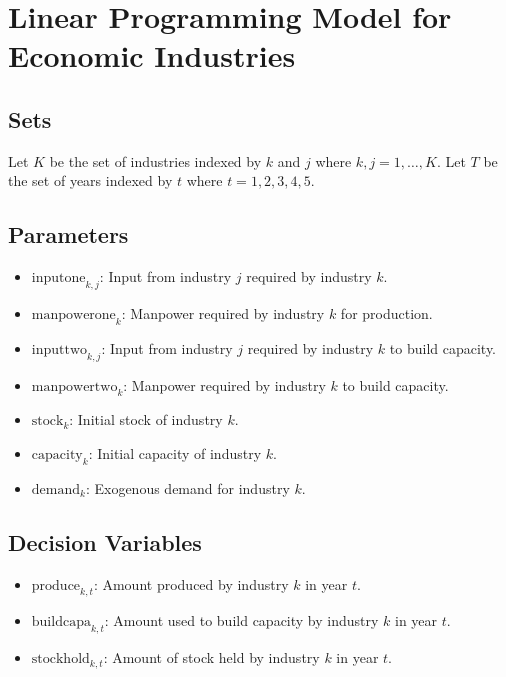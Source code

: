 \documentclass{article}
\begin{document}
\section*{Linear Programming Model for Economic Industries}

\subsection*{Sets}
Let \( K \) be the set of industries indexed by \( k \) and \( j \) where \( k, j = 1, \ldots, K \). 
Let \( T \) be the set of years indexed by \( t \) where \( t = 1, 2, 3, 4, 5 \).

\subsection*{Parameters}
\begin{itemize}
    \item \( \text{inputone}_{k,j} \): Input from industry \( j \) required by industry \( k \).
    \item \( \text{manpowerone}_{k} \): Manpower required by industry \( k \) for production.
    \item \( \text{inputtwo}_{k,j} \): Input from industry \( j \) required by industry \( k \) to build capacity.
    \item \( \text{manpowertwo}_{k} \): Manpower required by industry \( k \) to build capacity.
    \item \( \text{stock}_{k} \): Initial stock of industry \( k \).
    \item \( \text{capacity}_{k} \): Initial capacity of industry \( k \).
    \item \( \text{demand}_{k} \): Exogenous demand for industry \( k \).
\end{itemize}

\subsection*{Decision Variables}
\begin{itemize}
    \item \( \text{produce}_{k,t} \): Amount produced by industry \( k \) in year \( t \).
    \item \( \text{buildcapa}_{k,t} \): Amount used to build capacity by industry \( k \) in year \( t \).
    \item \( \text{stockhold}_{k,t} \): Amount of stock held by industry \( k \) in year \( t \).
\end{itemize}
\end{document}
